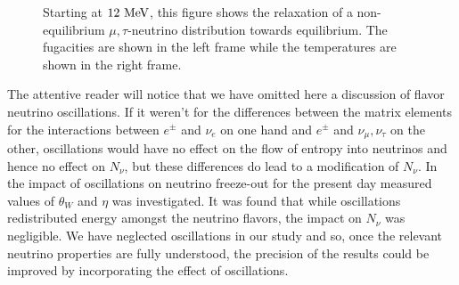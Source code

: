 \begin{figure} 

\begin{minipage}{\linewidth}
\end{minipage}
\caption{Starting at $12\text{ MeV}$, this figure shows the relaxation of a non-equilibrium $\mu,\tau$-neutrino distribution towards equilibrium. The fugacities are shown in the left frame while the temperatures are shown in the right frame.\label{fig:relax}}
 \end{figure}



The attentive reader will notice that we have omitted here a discussion of flavor neutrino oscillations. If it weren't for the differences between the matrix elements for the interactions between $e^\pm$ and $\nu_e$ on one hand and $e^\pm$ and $\nu_\mu,\nu_\tau$ on the other, oscillations would have no effect on the flow of entropy into neutrinos and hence no effect on $N_\nu$, but these differences do lead to a modification of $N_\nu$.  In \cite{Mangano2005} the impact of oscillations on neutrino freeze-out for the present day measured values of $\theta_W$ and $\eta$ was investigated.  It was found  that while oscillations redistributed energy amongst the neutrino flavors, the impact on $N_\nu$ was negligible. We have neglected oscillations in our study and so, once the relevant neutrino properties are fully understood, the precision of the results could be improved by incorporating the effect of oscillations.



